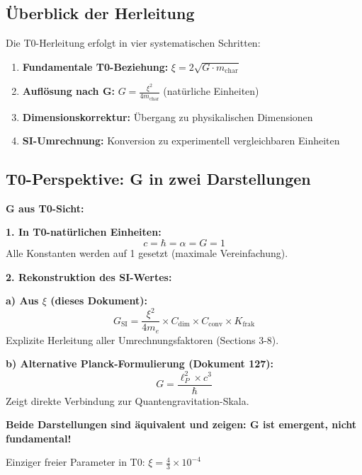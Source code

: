 	\subsection{Überblick der Herleitung}
	
	Die T0-Herleitung erfolgt in vier systematischen Schritten:
	
	\begin{enumerate}
		\item \textbf{Fundamentale T0-Beziehung:} $\xi = 2\sqrt{G \cdot m_{\text{char}}}$
		\item \textbf{Auflösung nach G:} $G = \frac{\xi^2}{4m_{\text{char}}}$ (natürliche Einheiten)
		\item \textbf{Dimensionskorrektur:} Übergang zu physikalischen Dimensionen
		\item \textbf{SI-Umrechnung:} Konversion zu experimentell vergleichbaren Einheiten
	\end{enumerate}
	
	\subsection{T0-Perspektive: G in zwei Darstellungen}
	
	\begin{keyresult}
		\textbf{G aus T0-Sicht:}
		
		\textbf{1. In T0-natürlichen Einheiten:}
		\begin{equation}
			c = \hbar = \alpha = G = 1
		\end{equation}
		Alle Konstanten werden auf 1 gesetzt (maximale Vereinfachung).
		
		\textbf{2. Rekonstruktion des SI-Wertes:}
		
		\textbf{a) Aus $\xi$ (dieses Dokument):}
		\begin{equation}
			G_{\text{SI}} = \frac{\xi^2}{4m_e} \times C_{\text{dim}} \times C_{\text{conv}} \times K_{\text{frak}}
		\end{equation}
		Explizite Herleitung aller Umrechnungsfaktoren (Sections 3-8).
		
		\textbf{b) Alternative Planck-Formulierung (Dokument 127):}
		\begin{equation}
			G = \frac{\ell_P^2 \times c^3}{\hbar}
		\end{equation}
		Zeigt direkte Verbindung zur Quantengravitation-Skala.
		
		\textbf{Beide Darstellungen sind äquivalent und zeigen: G ist emergent, nicht fundamental!}
		
		Einziger freier Parameter in T0: $\xi = \frac{4}{3} \times 10^{-4}$
	\end{keyresult}
	
